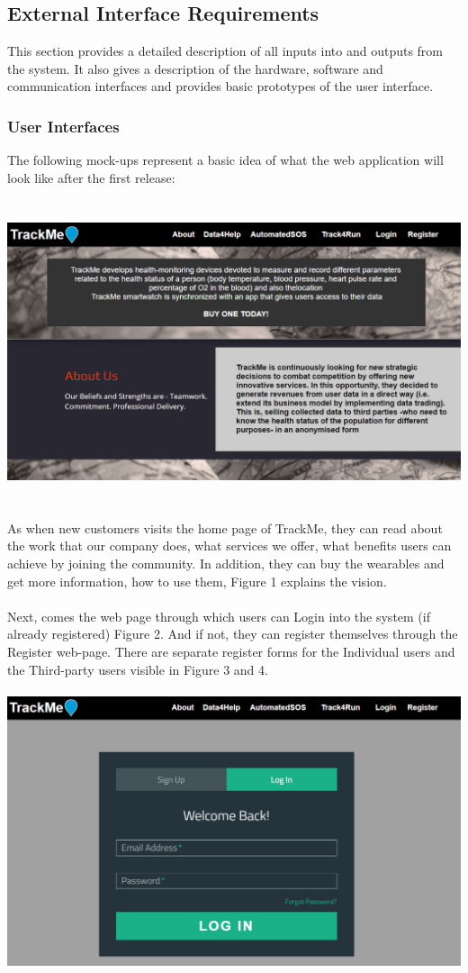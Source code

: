 \documentclass[12pt]{article}
\begin{document}
\subsection{External Interface Requirements}
This section provides a detailed description of all inputs into and outputs from the system. It also gives a
description of the hardware, software and communication interfaces and provides basic prototypes of the
user interface.
\subsubsection{User Interfaces}
The following mock-ups represent a basic idea of what the web application will look like after the first release:\\\\\\
\includegraphics[scale=0.6]{../Assets/Home_Page.png}\\\\\\
As when new customers visits the home page of TrackMe, they can read about the work that our company does, what services we offer, what benefits users can achieve by joining the community. In addition, they can buy the wearables and get more information, how to use them, Figure 1 explains the vision.\\\\
Next, comes the web page through which users can Login into the system (if already registered) Figure 2. And if not, they can register themselves through the Register web-page. There are separate register forms for the Individual users and the Third-party users visible in Figure 3 and 4.\\\\
\includegraphics[scale=0.6]{../Assets/Login.png}\\
\end{document}
